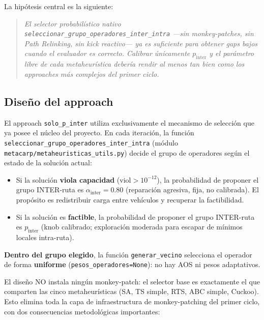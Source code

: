 La hipótesis central es la siguiente:

\begin{quote}
\textit{El selector probabilístico nativo
\texttt{seleccionar\_grupo\_operadores\_inter\_intra} ---sin
monkey-patches, sin Path Relinking, sin kick reactivo--- ya es
suficiente para obtener gaps bajos cuando el evaluador es correcto.
Calibrar únicamente $p_{\text{inter}}$ y el parámetro libre de cada
metaheurística debería rendir al menos tan bien como los approaches
más complejos del primer ciclo.}
\end{quote}

\subsection{Diseño del approach}

El approach \texttt{solo\_p\_inter} utiliza exclusivamente el
mecanismo de selección que ya posee el núcleo del proyecto. En cada
iteración, la función
\texttt{seleccionar\_grupo\_operadores\_inter\_intra} (módulo
\texttt{metacarp/metaheuristicas\_utils.py}) decide el grupo de
operadores según el estado de la solución actual:

\begin{itemize}
\item Si la solución \textbf{viola capacidad} ($\text{viol} > 10^{-12}$),
  la probabilidad de proponer el grupo INTER-ruta es
  $\alpha_{\text{inter}} = 0.80$ (reparación agresiva, fija, no
  calibrada). El propósito es redistribuir carga entre vehículos y
  recuperar la factibilidad.
\item Si la solución es \textbf{factible}, la probabilidad de proponer
  el grupo INTER-ruta es $p_{\text{inter}}$ (knob calibrado; exploración
  moderada para escapar de mínimos locales intra-ruta).
\end{itemize}

\textbf{Dentro del grupo elegido}, la función \texttt{generar\_vecino}
selecciona el operador de forma \textbf{uniforme}
(\texttt{pesos\_operadores=None}): no hay AOS ni pesos adaptativos.

El diseño NO instala ningún monkey-patch: el selector base es
exactamente el que comparten las cinco metaheurísticas (SA, TS simple,
RTS, ABC simple, Cuckoo). Esto elimina toda la capa de infraestructura
de monkey-patching del primer ciclo, con dos consecuencias
metodológicas importantes:

